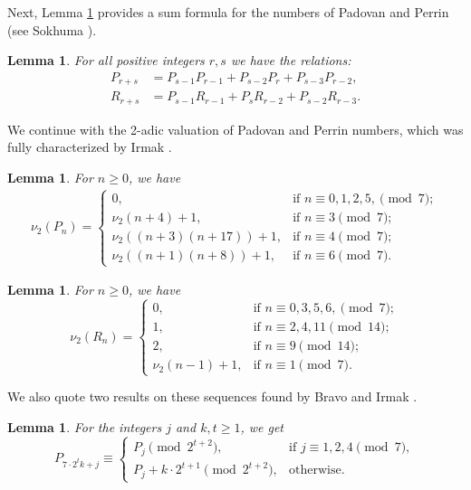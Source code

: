 \documentclass[11pt,a4paper]{article}
\newtheorem{lemma}[theorem]{Lemma}
\numberwithin{equation}{section}
\numberwithin{table}{section}
\numberwithin{figure}{section}
\begin{document}
Next, Lemma \ref{L1} provides a sum formula for the numbers of Padovan and Perrin (see Sokhuma \cite[Proposition 2.2]{KS}).
\begin{lemma}\label{L1}
	For all positive integers $r,s$ we have the relations:
	\begin{align*}
		P_{r+s}&=P_{s-1}P_{r-1}+P_{s-2}P_{r}+P_{s-3}P_{r-2},\\
		R_{r+s}&=P_{s-1}R_{r-1}+P_{s}R_{r-2}+P_{s-2}R_{r-3}.
	\end{align*}
\end{lemma}
\noindent
We continue with the 2-adic valuation of Padovan and Perrin numbers, which was fully characterized by Irmak \cite[Lemmas 2.5 and 2.6]{NI}.
\begin{lemma}\label{L2}
	For $n\ge 0$, we have 
	\begin{align*}
		\nu_2\left(P_{n}\right)= 
		\begin{cases}
			0, & \mbox{if } n\equiv 0,1,2,5,\pmod{7};\\
			\nu_2(n+4)+1, & \mbox{if } n\equiv 3\pmod{7};\\
			\nu_2((n+3)(n+17))+1, & \mbox{if }  n\equiv 4\pmod{7};\\
			\nu_2((n+1)(n+8))+1, & \mbox{if }  n\equiv 6\pmod{7}.
		\end{cases}
	\end{align*}
\end{lemma}
\begin{lemma}\label{L3}
	For $n\ge 0$, we have
	$$
	\nu_2\left(R_{n}\right)= 
	\begin{cases}
		0, & \mbox{if } n\equiv 0,3,5,6,\pmod{7};\\
		1, & \mbox{if }  n\equiv 2,4,11\pmod{14};\\
		2, & \mbox{if }  n\equiv 9\pmod{14};\\
		\nu_2(n-1)+1, & \mbox{if } n\equiv 1\pmod{7}.
	\end{cases}
	$$
\end{lemma}
\noindent
We also quote two results on these sequences found by Bravo and Irmak \cite[Lemmas 3.5 and 3.6]{BrIrmak}.
\begin{lemma}\label{L4}
	For the integers $j$ and $k,t\ge 1$, we get
	$$
	P_{7\cdot 2^{t}k+j}\equiv\begin{cases}
		P_{j}\pmod{2^{t+2}}, & \text{if } j\equiv 1,2,4\pmod{7},\\
		P_{j}+k\cdot 2^{t+1}\pmod{2^{t+2}}, & \text{otherwise}.
	\end{cases}
	$$
\end{lemma}
\end{document}
